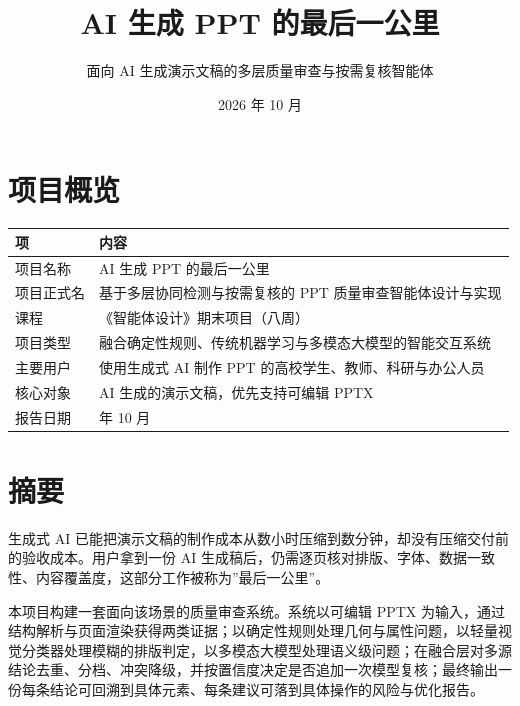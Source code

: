 \documentclass[
  11pt,
]{article}
\title{AI 生成 PPT 的最后一公里}
\subtitle{面向 AI 生成演示文稿的多层质量审查与按需复核智能体}
\author{}
\date{2026 年 10 月}
\newcounter{none} %
\let\pandocmk\maketitle
\renewcommand{\maketitle}{\pandocmk\thispagestyle{empty}\newpage}
\let\pandoctoc\tableofcontents
\renewcommand{\tableofcontents}{\pandoctoc\newpage}
\begin{document}
\maketitle

{
\setcounter{tocdepth}{1}
\tableofcontents
}
\section{项目概览}\label{ux9879ux76eeux6982ux89c8}

{\def\LTcaptype{none} %
\begin{longtable}[]{@{}
  >{\raggedright\arraybackslash}p{}
  >{\raggedright\arraybackslash}p{}@{}}
\toprule\noalign{}
\begin{minipage}[b]{\linewidth}\raggedright
项
\end{minipage} & \begin{minipage}[b]{\linewidth}\raggedright
内容
\end{minipage} \\
\midrule\noalign{}
\endhead
\bottomrule\noalign{}
\endlastfoot
项目名称 & AI 生成 PPT 的最后一公里 \\
项目正式名 & 基于多层协同检测与按需复核的 PPT
质量审查智能体设计与实现 \\
课程 & 《智能体设计》期末项目（八周） \\
项目类型 & 融合确定性规则、传统机器学习与多模态大模型的智能交互系统 \\
主要用户 & 使用生成式 AI 制作 PPT 的高校学生、教师、科研与办公人员 \\
核心对象 & AI 生成的演示文稿，优先支持可编辑 PPTX \\
报告日期 & 2026 年 10 月 \\
\end{longtable}
}

\section{摘要}\label{ux6458ux8981}

生成式 AI
已能把演示文稿的制作成本从数小时压缩到数分钟，却没有压缩交付前的验收成本。用户拿到一份
AI
生成稿后，仍需逐页核对排版、字体、数据一致性、内容覆盖度，这部分工作被称为''最后一公里''。

本项目构建一套面向该场景的质量审查系统。系统以可编辑 PPTX
为输入，通过结构解析与页面渲染获得两类证据；以确定性规则处理几何与属性问题，以轻量视觉分类器处理模糊的排版判定，以多模态大模型处理语义级问题；在融合层对多源结论去重、分档、冲突降级，并按置信度决定是否追加一次模型复核；最终输出一份每条结论可回溯到具体元素、每条建议可落到具体操作的风险与优化报告。
\end{document}
